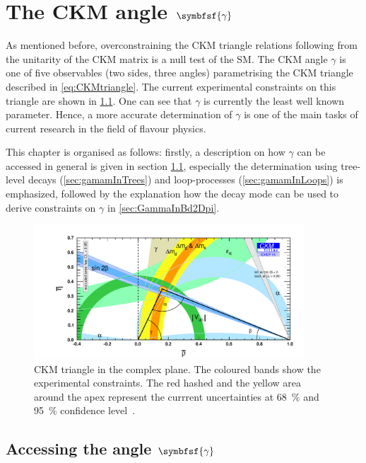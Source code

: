 \chapter[head={The CKM angle $\gamma$},tocentry={The CKM angle $\symbfsf{\gamma}$}]{The CKM angle $\symbfsf{\gamma}$}
\label{ch:CKMAngleGamma}

\linespread{1.08}\selectfont
As mentioned before, overconstraining the CKM triangle relations following from the unitarity of the CKM matrix is a null test of the \ac{SM}.
The CKM angle $\gamma$ is one of five observables (two sides, three angles) parametrising the CKM triangle described in \cref{eq:CKMtriangle}.
The current experimental constraints on this triangle are shown in \cref{fig:ckmtriangle}.
One can see that $\gamma$ is currently the least well known parameter.
Hence, a more accurate determination of $\gamma$ is one of the main tasks of current research in the field of flavour physics.

This chapter is organised as follows: firstly, a description on how $\gamma$ can be accessed in general is given in section \cref{sec:accessGamma}, especially the determination using tree-level decays (\cref{sec:gamamInTrees}) and loop-processes (\cref{sec:gamamInLoops}) is emphasized, followed by the explanation how the decay mode \BdToDpi can be used to derive constraints on $\gamma$ in \cref{sec:GammaInBd2Dpi}.

\begin{figure}[tbp]
	\centering
	\includegraphics[width=0.9\textwidth]{04gamma/figs/CKMTriangle.pdf}
	\caption{CKM triangle in the complex plane.
	The coloured bands show the experimental constraints.
	The red hashed and the yellow area around the apex represent the currrent uncertainties at \SI{68}{\percent} and \SI{95}{\percent} confidence level~\cite{CKMfitter2015}.}
	\label{fig:ckmtriangle}
\end{figure}

\section[head={Accessing the angle $\gamma$},tocentry={Accessing the angle $\gamma$}]{Accessing the angle $\symbfsf{\gamma}$}
\label{sec:accessGamma}

